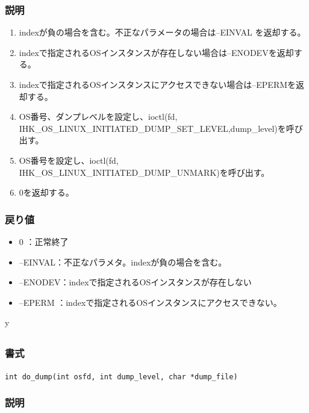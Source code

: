 \documentclass[twoside,11pt,fleqn]{book}
\begin{document}
\subsubsection*{説明}{\quad} 
\begin{enumerate}
\item indexが負の場合を含む。不正なパラメータの場合は--EINVAL を返却する。
\item indexで指定されるOSインスタンスが存在しない場合は--ENODEVを返却する。
\item indexで指定されるOSインスタンスにアクセスできない場合は--EPERMを返却する。
\item OS番号、ダンプレベルを設定し、ioctl(fd, IHK\_OS\_LINUX\_INITIATED\_DUMP\newline \_SET\_LEVEL,dump\_level)を呼び出す。
\item OS番号を設定し、ioctl(fd, IHK\_OS\_LINUX\_INITIATED\_DUMP\_UNMARK)を呼び出す。
\item0を返却する。
\end{enumerate}

\subsubsection*{戻り値}{\quad}
\begin{itemize}
\item 0      ：正常終了
\item --EINVAL：不正なパラメタ。indexが負の場合を含む。
\item --ENODEV：indexで指定されるOSインスタンスが存在しない
\item --EPERM ：indexで指定されるOSインスタンスにアクセスできない。
\end{itemize}
\fi

\ifx \HLDIFFJULTWO y
\subsection{}
\subsubsection*{書式}{\quad} \texttt{int do\_dump(int osfd, int dump\_level, char *dump\_file)}
\subsubsection*{説明}{\quad} 
\end{document}
